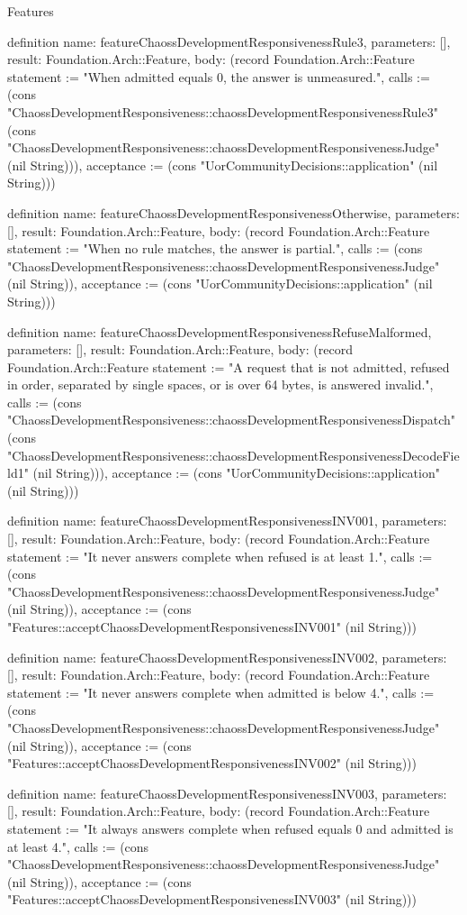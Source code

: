 \begin{lexlean}{Features}
\begin{semanticmodule}
definition{
  name: featureChaossDevelopmentResponsivenessRule3,
  parameters: [],
  result: Foundation.Arch::Feature,
  body: (record Foundation.Arch::Feature {statement := "When admitted equals 0, the answer is unmeasured.", calls := (cons "ChaossDevelopmentResponsiveness::chaossDevelopmentResponsivenessRule3" (cons "ChaossDevelopmentResponsiveness::chaossDevelopmentResponsivenessJudge" (nil String))), acceptance := (cons "UorCommunityDecisions::application" (nil String))})
}

definition{
  name: featureChaossDevelopmentResponsivenessOtherwise,
  parameters: [],
  result: Foundation.Arch::Feature,
  body: (record Foundation.Arch::Feature {statement := "When no rule matches, the answer is partial.", calls := (cons "ChaossDevelopmentResponsiveness::chaossDevelopmentResponsivenessJudge" (nil String)), acceptance := (cons "UorCommunityDecisions::application" (nil String))})
}

definition{
  name: featureChaossDevelopmentResponsivenessRefuseMalformed,
  parameters: [],
  result: Foundation.Arch::Feature,
  body: (record Foundation.Arch::Feature {statement := "A request that is not admitted, refused in order, separated by single spaces, or is over 64 bytes, is answered invalid.", calls := (cons "ChaossDevelopmentResponsiveness::chaossDevelopmentResponsivenessDispatch" (cons "ChaossDevelopmentResponsiveness::chaossDevelopmentResponsivenessDecodeField1" (nil String))), acceptance := (cons "UorCommunityDecisions::application" (nil String))})
}

definition{
  name: featureChaossDevelopmentResponsivenessINV001,
  parameters: [],
  result: Foundation.Arch::Feature,
  body: (record Foundation.Arch::Feature {statement := "It never answers complete when refused is at least 1.", calls := (cons "ChaossDevelopmentResponsiveness::chaossDevelopmentResponsivenessJudge" (nil String)), acceptance := (cons "Features::acceptChaossDevelopmentResponsivenessINV001" (nil String))})
}

definition{
  name: featureChaossDevelopmentResponsivenessINV002,
  parameters: [],
  result: Foundation.Arch::Feature,
  body: (record Foundation.Arch::Feature {statement := "It never answers complete when admitted is below 4.", calls := (cons "ChaossDevelopmentResponsiveness::chaossDevelopmentResponsivenessJudge" (nil String)), acceptance := (cons "Features::acceptChaossDevelopmentResponsivenessINV002" (nil String))})
}

definition{
  name: featureChaossDevelopmentResponsivenessINV003,
  parameters: [],
  result: Foundation.Arch::Feature,
  body: (record Foundation.Arch::Feature {statement := "It always answers complete when refused equals 0 and admitted is at least 4.", calls := (cons "ChaossDevelopmentResponsiveness::chaossDevelopmentResponsivenessJudge" (nil String)), acceptance := (cons "Features::acceptChaossDevelopmentResponsivenessINV003" (nil String))})
}


\end{semanticmodule}
\end{lexlean}
